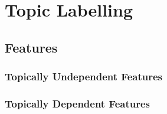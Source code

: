 \section{Topic Labelling}
\label{sec:topic_labelling}
  \subsection{}
  \label{}

  \subsection{Features}
  \label{subsec:features}
    \subsubsection{Topically Undependent Features}
    \label{subsubsec:topically_undependent_features}
      \paragraph{}

    \subsubsection{Topically Dependent Features}
    \label{subsubsec:topically_dependent_features}

